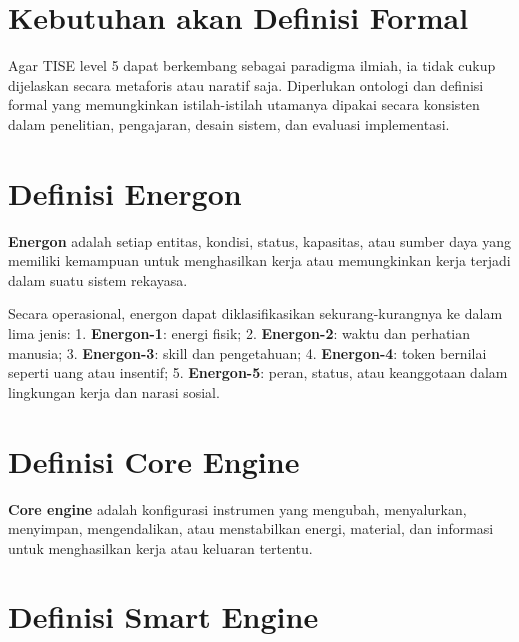 \documentclass[
  letterpaper,
  DIV=11,
  numbers=noendperiod]{scrreprt}
\begin{document}

\section*{Kebutuhan akan Definisi
Formal}\label{kebutuhan-akan-definisi-formal}


Agar TISE level 5 dapat berkembang sebagai paradigma ilmiah, ia tidak
cukup dijelaskan secara metaforis atau naratif saja. Diperlukan ontologi
dan definisi formal yang memungkinkan istilah-istilah utamanya dipakai
secara konsisten dalam penelitian, pengajaran, desain sistem, dan
evaluasi implementasi.

\section*{Definisi Energon}\label{definisi-energon}


\textbf{Energon} adalah setiap entitas, kondisi, status, kapasitas, atau
sumber daya yang memiliki kemampuan untuk menghasilkan kerja atau
memungkinkan kerja terjadi dalam suatu sistem rekayasa.

Secara operasional, energon dapat diklasifikasikan sekurang-kurangnya ke
dalam lima jenis: 1. \textbf{Energon-1}: energi fisik; 2.
\textbf{Energon-2}: waktu dan perhatian manusia; 3. \textbf{Energon-3}:
skill dan pengetahuan; 4. \textbf{Energon-4}: token bernilai seperti
uang atau insentif; 5. \textbf{Energon-5}: peran, status, atau
keanggotaan dalam lingkungan kerja dan narasi sosial.

\section*{Definisi Core Engine}\label{definisi-core-engine}


\textbf{Core engine} adalah konfigurasi instrumen yang mengubah,
menyalurkan, menyimpan, mengendalikan, atau menstabilkan energi,
material, dan informasi untuk menghasilkan kerja atau keluaran tertentu.

\section*{Definisi Smart Engine}\label{definisi-smart-engine}
\end{document}
